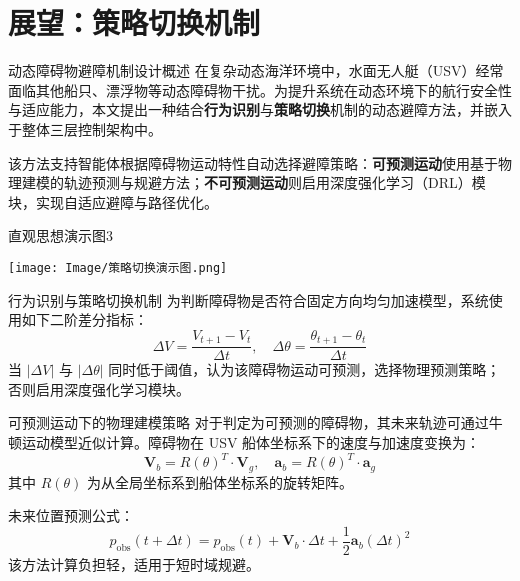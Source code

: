 \section{展望：策略切换机制}

\begin{frame}{动态障碍物避障机制设计概述}
\justifying
在复杂动态海洋环境中，水面无人艇（USV）经常面临其他船只、漂浮物等动态障碍物干扰。为提升系统在动态环境下的航行安全性与适应能力，本文提出一种结合\textbf{行为识别}与\textbf{策略切换}机制的动态避障方法，并嵌入于整体三层控制架构中。

\vspace{0.5em}
该方法支持智能体根据障碍物运动特性自动选择避障策略：\textbf{可预测运动}使用基于物理建模的轨迹预测与规避方法；\textbf{不可预测运动}则启用深度强化学习（DRL）模块，实现自适应避障与路径优化。
\end{frame}

\begin{frame}[plain]{直观思想演示图3}
\begin{center}
    \texttt{[image: Image/策略切换演示图.png]}
\end{center}
\end{frame}

\begin{frame}{行为识别与策略切换机制}
\justifying
为判断障碍物是否符合固定方向均匀加速模型，系统使用如下二阶差分指标：
\[
\Delta V = \frac{V_{t+1} - V_t}{\Delta t}, \quad \Delta\theta = \frac{\theta_{t+1} - \theta_t}{\Delta t}
\]
当 $|\Delta V|$ 与 $|\Delta\theta|$ 同时低于阈值，认为该障碍物运动可预测，选择物理预测策略；否则启用深度强化学习模块。
\end{frame}

\begin{frame}{可预测运动下的物理建模策略}
\justifying
对于判定为可预测的障碍物，其未来轨迹可通过牛顿运动模型近似计算。障碍物在 USV 船体坐标系下的速度与加速度变换为：
\[
\mathbf{V}_b = R(\theta)^T \cdot \mathbf{V}_g, \quad \mathbf{a}_b = R(\theta)^T \cdot \mathbf{a}_g
\]
其中 $R(\theta)$ 为从全局坐标系到船体坐标系的旋转矩阵。

未来位置预测公式：
\[
p_{\text{obs}}(t + \Delta t) = p_{\text{obs}}(t) + \mathbf{V}_b \cdot \Delta t + \frac{1}{2} \mathbf{a}_b (\Delta t)^2
\]
该方法计算负担轻，适用于短时域规避。
\end{frame}

